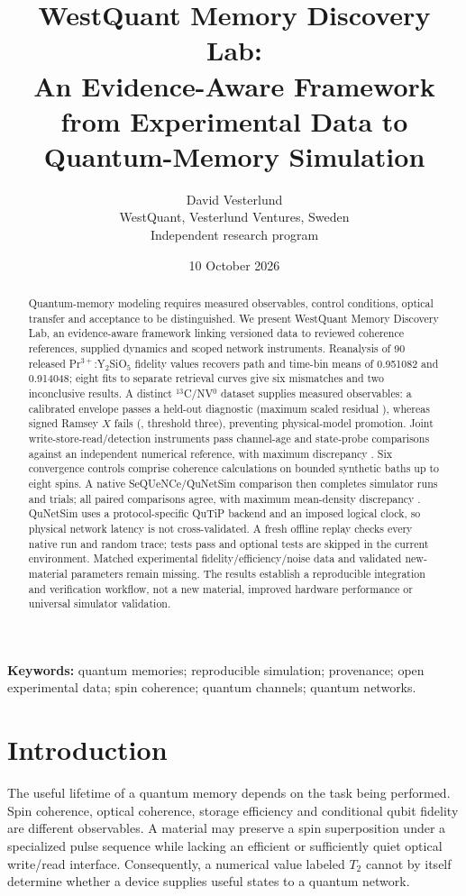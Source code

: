 \documentclass[11pt,a4paper]{article}
\title{WestQuant Memory Discovery Lab:\\An Evidence-Aware Framework from Experimental Data to Quantum-Memory Simulation}
\author{David Vesterlund\\\small WestQuant, Vesterlund Ventures, Sweden\\\small Independent research program}
\date{10 October 2026}
\begin{document}
\maketitle
\begin{abstract}
Quantum-memory modeling requires measured observables, control conditions, optical transfer and acceptance to be distinguished. We present WestQuant Memory Discovery Lab, an evidence-aware framework linking versioned data to reviewed coherence references, supplied dynamics and scoped network instruments. Reanalysis of 90 released Pr$^{3+}$:Y$_2$SiO$_5$ fidelity values recovers path and time-bin means of 0.951082 and 0.914048; eight fits to separate retrieval curves give six mismatches and two inconclusive results. A distinct $^{13}$C/NV$^0$ dataset supplies \BPoints{} measured observables: a calibrated envelope passes a held-out diagnostic (maximum scaled residual \BEnvelopeError{}), whereas signed Ramsey $X$ fails (\BXError{}, threshold three), preventing physical-model promotion. Joint write-store-read/detection instruments pass \ProtoPoints{} channel-age and \ProtoProbes{} state-probe comparisons against an independent numerical reference, with maximum discrepancy \ProtoError{}. Six convergence controls comprise \ConvCalls{} coherence calculations on bounded synthetic baths up to eight spins. A native SeQUeNCe/QuNetSim comparison then completes \LargerRuns{} simulator runs and \LargerAttempts{} trials; all \LargerPairs{} paired comparisons agree, with maximum mean-density discrepancy \LargerError{}. QuNetSim uses a protocol-specific QuTiP backend and an imposed logical clock, so physical network latency is not cross-validated. A fresh offline replay checks every native run and random trace; \LatestPass{} tests pass and \LatestSkip{} optional tests are skipped in the current environment. Matched experimental fidelity/efficiency/noise data and validated new-material parameters remain missing. The results establish a reproducible integration and verification workflow, not a new material, improved hardware performance or universal simulator validation.
\end{abstract}
\noindent\textbf{Keywords:} quantum memories; reproducible simulation; provenance; open experimental data; spin coherence; quantum channels; quantum networks.

\section{Introduction}
The useful lifetime of a quantum memory depends on the task being performed. Spin coherence, optical coherence, storage efficiency and conditional qubit fidelity are different observables. A material may preserve a spin superposition under a specialized pulse sequence while lacking an efficient or sufficiently quiet optical write/read interface. Consequently, a numerical value labeled $T_2$ cannot by itself determine whether a device supplies useful states to a quantum network.
\end{document}

